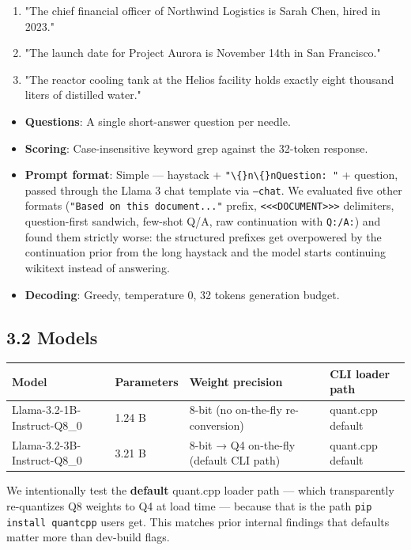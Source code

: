 \documentclass[11pt]{article}
\begin{document}
\begin{enumerate}
\item "The chief financial officer of Northwind Logistics is Sarah Chen, hired in 2023."
\item "The launch date for Project Aurora is November 14th in San Francisco."
\item "The reactor cooling tank at the Helios facility holds exactly eight thousand liters of distilled water."
\end{enumerate}

\begin{itemize}
\item \textbf{Questions}: A single short-answer question per needle.
\item \textbf{Scoring}: Case-insensitive keyword grep against the 32-token response.
\item \textbf{Prompt format}: Simple — haystack + \texttt{"\textbackslash\{\}n\textbackslash\{\}nQuestion: "} + question, passed through the Llama 3 chat template via \texttt{--chat}. We evaluated five other formats (\texttt{"Based on this document..."} prefix, \texttt{<<<DOCUMENT>>>} delimiters, question-first sandwich, few-shot Q/A, raw continuation with \texttt{Q:/A:}) and found them strictly worse: the structured prefixes get overpowered by the continuation prior from the long haystack and the model starts continuing wikitext instead of answering.
\item \textbf{Decoding}: Greedy, temperature 0, 32 tokens generation budget.
\end{itemize}


\subsection*{3.2 Models}


\begin{center}
\begin{tabular}{llll}
\toprule
Model & Parameters & Weight precision & CLI loader path \\
\midrule
Llama-3.2-1B-Instruct-Q8\_0 & 1.24 B & 8-bit (no on-the-fly re-conversion) & quant.cpp default \\
Llama-3.2-3B-Instruct-Q8\_0 & 3.21 B & 8-bit → Q4 on-the-fly (default CLI path) & quant.cpp default \\
\bottomrule
\end{tabular}
\end{center}


We intentionally test the \textbf{default} quant.cpp loader path — which transparently re-quantizes Q8 weights to Q4 at load time — because that is the path \texttt{pip install quantcpp} users get. This matches prior internal findings that defaults matter more than dev-build flags.
\end{document}
